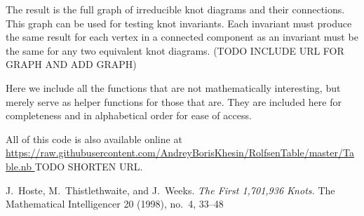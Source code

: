 \begin{paper}

The result is the full graph of irreducible knot diagrams and their connections.
This graph can be used for testing knot invariants.
Each invariant must produce the same result for each vertex in a connected
component as an invariant must be the same for any two equivalent knot diagrams.
(TODO INCLUDE URL FOR GRAPH AND ADD GRAPH)


Here we include all the functions that are not mathematically interesting, but
merely serve as helper functions for those that are.
They are included here for completeness and in alphabetical order for ease of
access.

All of this code is also available online at \url{
https://raw.githubusercontent.com/AndreyBorisKhesin/RolfsenTable/master/Table.nb
} TODO SHORTEN URL.
















\begin{thebibliography}{}
J.~Hoste, M.~Thistlethwaite, and J.~Weeks.
\textit{The First 1,701,936 Knots.}
The Mathematical Intelligencer 20 (1998), no.~4, 33--48
\end{thebibliography}

\end{paper}

